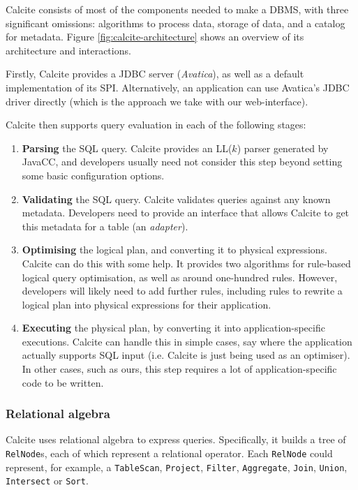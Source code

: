 Calcite consists of most of the components needed to make a DBMS, with three significant omissions: algorithms to process data, storage of data, and a catalog for metadata. Figure \ref{fig:calcite-architecture} shows an overview of its architecture and interactions.

Firstly, Calcite provides a JDBC server (\emph{Avatica}), as well as a default implementation of its SPI. Alternatively, an application can use Avatica's JDBC driver directly (which is the approach we take with our web-interface).

Calcite then supports query evaluation in each of the following stages:
\begin{enumerate}
    \item \textbf{Parsing} the SQL query. Calcite provides an LL($k$) parser generated by JavaCC, and developers usually need not consider this step beyond setting some basic configuration options.
    \item \textbf{Validating} the SQL query. Calcite validates queries against any known metadata. Developers need to provide an interface that allows Calcite to get this metadata for a table (an \emph{adapter}).
    \item \textbf{Optimising} the logical plan, and converting it to physical expressions. Calcite can do this with some help. It provides two algorithms for rule-based logical query optimisation, as well as around one-hundred rules. However, developers will likely need to add further rules, including rules to rewrite a logical plan into physical expressions for their application.
    \item \textbf{Executing} the physical plan, by converting it into application-specific executions. Calcite can handle this in simple cases, say where the application actually supports SQL input (i.e. Calcite is just being used as an optimiser). In other cases, such as ours, this step requires a lot of application-specific code to be written.
\end{enumerate}

\subsubsection{Relational algebra}

Calcite uses relational algebra \cite{Codd:1970:RMD:362384.362685} to express queries. Specifically, it builds a tree of \texttt{RelNode}s, each of which represent a relational operator. Each \texttt{RelNode} could represent, for example, a \texttt{TableScan}, \texttt{Project}, \texttt{Filter}, \texttt{Aggregate}, \texttt{Join}, \texttt{Union}, \texttt{Intersect} or \texttt{Sort}.

